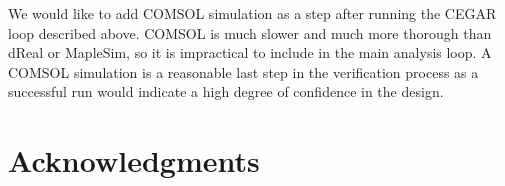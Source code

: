
We would like to add COMSOL simulation as a step after running the CEGAR loop described above.
COMSOL is much slower and much more thorough than dReal or MapleSim, so it is impractical to include
in the main analysis loop. A COMSOL simulation is a reasonable last step in the
verification process as a successful run would indicate a high degree of confidence in the design.

\section{Acknowledgments}


